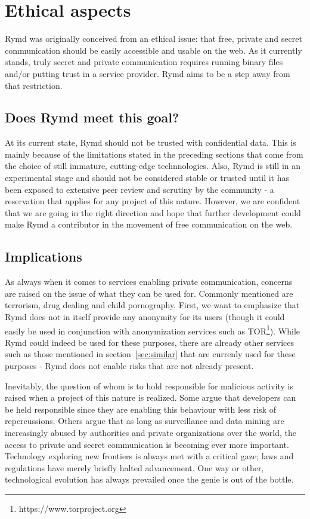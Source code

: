 \section{Ethical aspects}
Rymd was originally conceived from an ethical issue: that free, private and secret communication should be easily accessible and usable on the web. As it currently stands, truly secret and private communication requires running binary files and/or putting trust in a service provider. Rymd aims to be a step away from that restriction.

\subsection{Does Rymd meet this goal?}
At its current state, Rymd should not be trusted with confidential data. This is mainly because of the limitations stated in the preceding sections that come from the choice of still immature, cutting-edge technnologies. Also, Rymd is still in an experimental stage and should not be considered stable or trusted until it has been exposed to extensive peer review and scrutiny by the community - a reservation that applies for any project of this nature. However, we are confident that we are going in the right direction and hope that further development could make Rymd a contributor in the movement of free communication on the web.

\subsection{Implications}
As always when it comes to services enabling private communication, concerns are raised on the issue of what they can be used for. Commonly mentioned are terrorism, drug dealing and child pornography. First, we want to emphasize that Rymd does not in itself provide any anonymity for its users (though it could easily be used in conjunction with anonymization services such as TOR\footnote{https://www.torproject.org}). While Rymd could indeed be used for these purposes, there are already other services such as those mentioned in section~\ref{sec:similar} that are currenly used for these purposes - Rymd does not enable risks that are not already present.

Inevitably, the question of whom is to hold responsible for malicious activity is raised when a project of this nature is realized. Some argue that developers can be held responsible since they are enabling this behaviour with less risk of repercussions. Others argue that as long as surveillance and data mining are increasingly abused by authorities and private organizations over the world, the access to private and secret communication is becoming ever more important. Technology exploring new frontiers is always met with a critical gaze; laws and regulations have merely briefly halted advancement. One way or other, technological evolution has always prevailed once the genie is out of the bottle.

